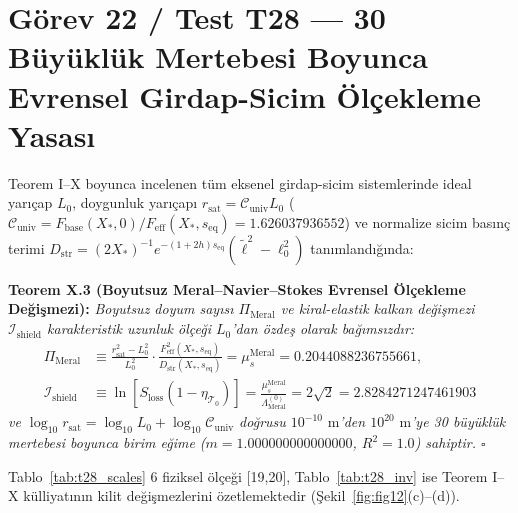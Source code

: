 \documentclass[12pt,a4paper]{article}
\begin{document}
\section{Görev 22 / Test T28 --- 30 Büyüklük Mertebesi Boyunca Evrensel Girdap-Sicim Ölçekleme Yasası}

Teorem I--X boyunca incelenen tüm eksenel girdap-sicim sistemlerinde ideal yarıçap $L_0$, doygunluk yarıçapı $r_{\mathrm{sat}} = \mathcal{C}_{\mathrm{univ}} L_0$ ($\mathcal{C}_{\mathrm{univ}} = F_{\mathrm{base}}(X_*,0)/F_{\mathrm{eff}}(X_*,s_{\mathrm{eq}}) = 1.626037936552$) ve normalize sicim basınç terimi $D_{\mathrm{str}} = (2X_*)^{-1}e^{-(1+2h)s_{\mathrm{eq}}}(\tilde{\ell}^2 - \ell_0^2)$ tanımlandığında:

\textbf{Teorem X.3 (Boyutsuz Meral--Navier--Stokes Evrensel Ölçekleme Değişmezi):} \textit{Boyutsuz doyum sayısı $\Pi_{\mathrm{Meral}}$ ve kiral-elastik kalkan değişmezi $\mathcal{I}_{\mathrm{shield}}$ karakteristik uzunluk ölçeği $L_0$'dan özdeş olarak bağımsızdır:}
\begin{equation}
\begin{split}
\Pi_{\mathrm{Meral}}
&\equiv \frac{r_{\mathrm{sat}}^2 - L_0^2}{L_0^2}\cdot\frac{F_{\mathrm{eff}}^2(X_*,s_{\mathrm{eq}})}{D_{\mathrm{str}}(X_*,s_{\mathrm{eq}})}
= \mu_s^{\mathrm{Meral}} = 0.2044088236755661, \\
\mathcal{I}_{\mathrm{shield}}
&\equiv \ln\!\left[S_{\mathrm{loss}}(1-\eta_{\mathcal{T}_0})\right]
= \frac{\mu_s^{\mathrm{Meral}}}{\Lambda_{\mathrm{Meral}}^{(0)}}
= 2\sqrt{2} = 2.8284271247461903
\end{split}
\label{eq:t28_pi}
\end{equation}
\textit{ve $\log_{10} r_{\mathrm{sat}} = \log_{10} L_0 + \log_{10}\mathcal{C}_{\mathrm{univ}}$ doğrusu $10^{-10}\text{ m}$'den $10^{20}\text{ m}$'ye 30 büyüklük mertebesi boyunca birim eğime ($m = 1.000000000000000$, $R^2 = 1.0$) sahiptir. $\square$}

Tablo~\ref{tab:t28_scales} 6 fiziksel ölçeği [19,20], Tablo~\ref{tab:t28_inv} ise Teorem I--X külliyatının kilit değişmezlerini özetlemektedir (Şekil~\ref{fig:fig12}(c)--(d)).
\end{document}

